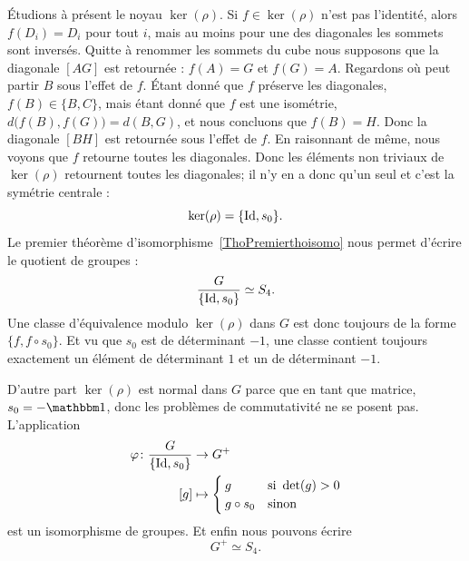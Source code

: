 Étudions à présent le noyau \( \ker(\rho)\). Si \( f\in\ker(\rho)\) n'est pas l'identité, alors \( f(D_i)=D_i\) pour tout \( i\), mais au moins pour une des diagonales les sommets sont inversés. Quitte à renommer les sommets du cube nous supposons que la diagonale \( [AG]\) est retournée : \( f(A)=G\) et \( f(G)=A\). Regardons où peut partir \( B\) sous l'effet de \( f\). Étant donné que \( f\) préserve les diagonales, \( f(B)\in\{ B,C \}\), mais étant donné que \( f\) est une isométrie, \( d\big( f(B),f(G) \big)=d(B,G)\), et nous concluons que \( f(B)=H\). Donc la diagonale \( [BH]\) est retournée sous l'effet de \( f\). En raisonnant de même, nous voyons que \( f\) retourne toutes les diagonales. Donc les éléments non triviaux de \( \ker(\rho)\) retournent toutes les diagonales; il n'y en a donc qu'un seul et c'est la symétrie centrale :
\begin{equation}
    \ker(\rho)=\{ \operatorname{Id},s_0 \}.
\end{equation}
Le premier théorème d'isomorphisme~\ref{ThoPremierthoisomo} nous permet d'écrire le quotient de groupes :
\begin{equation}
    \frac{ G }{ \{ \operatorname{Id},s_0 \} }\simeq S_4.
\end{equation}
Une classe d'équivalence modulo \( \ker(\rho)\) dans \( G\) est donc toujours de la forme \( \{ f,f\circ s_0 \}\). Et vu que \( s_0\) est de déterminant \( -1\), une classe contient toujours exactement un élément de déterminant \( 1\) et un de déterminant \( -1\).

D'autre part \( \ker(\rho)\) est normal dans \( G\) parce que en tant que matrice, \( s_0=-\mtu\), donc les problèmes de commutativité ne se posent pas. L'application
\begin{equation}
    \begin{aligned}
        \varphi\colon \frac{ G }{ \{ \operatorname{Id},s_0 \} }&\to G^+ \\
        [g]&\mapsto \begin{cases}
            g    &   \text{si } \mathop{\mathrm{det}}\nolimits(g)>0\\
            g\circ s_0    &    \text{sinon}
        \end{cases}
    \end{aligned}
\end{equation}
est un isomorphisme de groupes. Et enfin nous pouvons écrire
\begin{equation}
    G^+\simeq S_4.
\end{equation}

